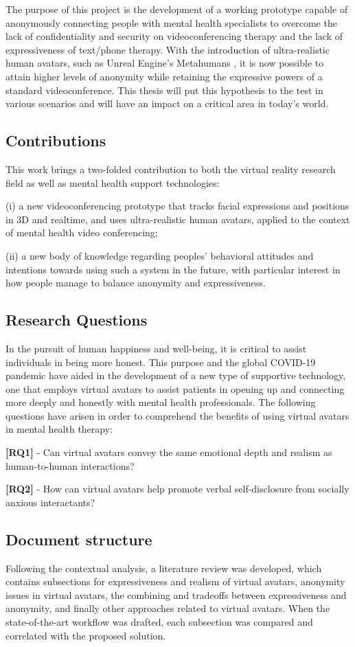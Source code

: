 The purpose of this project is the development of a working prototype capable of anonymously connecting people with mental health specialists to overcome the lack of confidentiality and security on videoconferencing therapy and the lack of expressiveness of text/phone therapy. With the introduction of ultra-realistic human avatars, such as Unreal Engine's Metahumans \cite{EPI21, FAN21}, it is now possible to attain higher levels of anonymity while retaining the expressive powers of a standard videoconference. This thesis will put this hypothesis to the test in various scenarios and will have an impact on a critical area in today's world.

\subsection{Contributions}
This work brings a two-folded contribution to both the virtual reality research field as well as mental health support technologies:

(i) a new videoconferencing prototype that tracks facial expressions and positions in 3D and realtime, and uses ultra-realistic human avatars, applied to the context of mental health video conferencing;

(ii) a new body of knowledge regarding peoples’ behavioral attitudes and intentions towards using such a system in the future, with particular interest in how people manage to balance anonymity and expressiveness.

\subsection{Research Questions}
In the pursuit of human happiness and well-being, it is critical to assist individuals in being more honest. This purpose and the global COVID-19 pandemic have aided in the development of a new type of supportive technology, one that employs virtual avatars to assist patients in opening up and connecting more deeply and honestly with mental health professionals. The following questions have arisen in order to comprehend the benefits of using virtual avatars in mental health therapy:

\textbf{[RQ1]} - Can virtual avatars convey the same emotional depth and realism as human-to-human interactions?

\textbf{[RQ2]} - How can virtual avatars help promote verbal self-disclosure from socially anxious interactants?

\subsection{Document structure}
Following the contextual analysis, a literature review was developed, which contains subsections for expressiveness and realism of virtual avatars, anonymity issues in virtual avatars, the combining and tradeoffs between expressiveness and anonymity, and finally other approaches related to virtual avatars. When the state-of-the-art workflow was drafted, each subsection was compared and correlated with the proposed solution.

